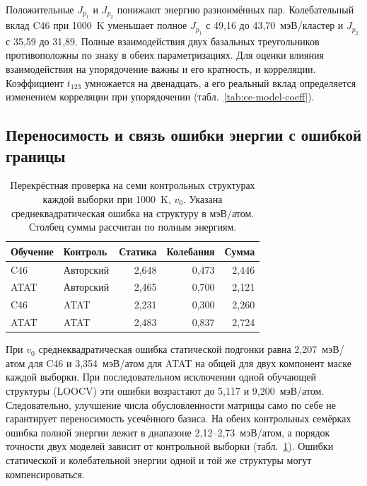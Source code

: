 \documentclass[11pt,a4paper]{article}
\begin{document}
Положительные \(J_{p_1}\) и \(J_{p_2}\) понижают энергию разноимённых
пар. Колебательный вклад C46 при 1000~K уменьшает полное \(J_{p_1}\)
с 49,16 до 43,70~мэВ/кластер и \(J_{p_2}\) с 35,59 до 31,89.
Полные взаимодействия двух базальных треугольников противоположны
по знаку в обеих параметризациях. Для оценки влияния
взаимодействия на упорядочение важны и его кратность, и корреляции. Коэффициент
\(t_{123}\) умножается на двенадцать, а его реальный вклад определяется
изменением корреляции при упорядочении (табл.~\ref{tab:ce-model-coeff}).

\subsection{Переносимость и связь ошибки энергии с ошибкой границы}

\begin{table}[htbp]
\centering\small
\caption{Перекрёстная проверка на семи контрольных структурах каждой
выборки при 1000~K, \(v_0\). Указана среднеквадратическая ошибка
на структуру в мэВ/атом. Столбец суммы рассчитан по полным энергиям.}
\label{tab:ce-model-transfer}
\begin{tabular}{llrrr}
\toprule
Обучение & Контроль & Статика & Колебания & Сумма\\
\midrule
C46  & Авторский & 2,648 & 0,473 & 2,446\\
ATAT & Авторский & 2,465 & 0,700 & 2,121\\
C46  & ATAT      & 2,231 & 0,300 & 2,260\\
ATAT & ATAT      & 2,483 & 0,837 & 2,724\\
\bottomrule
\end{tabular}
\end{table}

При \(v_0\) среднеквадратическая ошибка статической подгонки равна
2,207~мэВ/атом для C46 и 3,354~мэВ/атом для ATAT на общей для двух
компонент маске каждой выборки. При последовательном исключении одной
обучающей структуры (LOOCV) эти ошибки возрастают до 5,117 и
9,200~мэВ/атом. Следовательно, улучшение числа обусловленности матрицы
само по себе не гарантирует переносимость усечённого базиса. На обеих
контрольных семёрках ошибка полной энергии лежит в диапазоне
2,12--2,73~мэВ/атом, а порядок точности двух моделей зависит от
контрольной выборки (табл.~\ref{tab:ce-model-transfer}). Ошибки
статической и колебательной энергии одной и той же структуры могут
компенсироваться.
\end{document}
